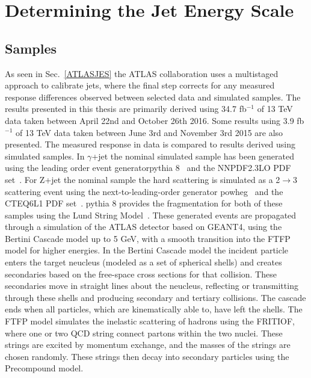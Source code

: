 \chapter{Determining the Jet Energy Scale}
\label{JES2}

\section{Samples}
As seen in Sec.~\ref{ATLASJES} the ATLAS collaboration uses a multistaged approach to calibrate jets, where the final step corrects for any measured response differences observed between selected data and simulated samples.  
The results presented in this thesis are primarily derived using 34.7 fb$^{-1}$ of 13 TeV data taken between April 22nd and October 26th 2016. 
Some results using 3.9 fb$^{-1}$ of 13 TeV data taken between June 3rd and November 3rd 2015 are also presented.  
The measured response in data is compared to results derived using simulated samples.  
In $\gamma$+jet the nominal simulated sample has been generated using the leading order event generator{\sc pythia} 8~\cite{Sjostrand:2007gs} and the NNPDF2.3LO PDF set~\cite{Ball:2013hta}.  
For Z+jet the nominal sample the hard scattering is simulated as a 2$\rightarrow$3 scattering event using the next-to-leading-order generator {\sc powheg}~\cite{Nason:2004rx, Frixione:2007vw, Alioli:2010xd} and the CTEQ6L1 PDF set~\cite{Pumplin:2002vw}.   
{\sc pythia} 8 provides the fragmentation for both of these samples using the Lund String Model~\cite{ANDERSSON198331}.  
These generated events are propagated through a simulation of the ATLAS detector based on GEANT4, using the Bertini Cascade model up to 5 GeV, with a smooth transition into the FTFP model for higher energies.  
In the Bertini Cascade model the incident particle enters the target neucleus (modeled as a set of spherical shells) and creates secondaries based on the free-space cross sections for that collision.  
These secondaries move in straight lines about the neucleus, reflecting or transmitting through these shells and producing secondary and tertiary collisions.  
The cascade ends when all particles, which are kinematically able to, have left the shells.  
The FTFP model simulates the inelastic scattering of hadrons using the FRITIOF, where one or two QCD string connect partons within the two nuclei.  
These strings are excited by momentum exchange, and the masses of the strings are chosen randomly.  
These strings then decay into secondary particles using the Precompound model.  
 




